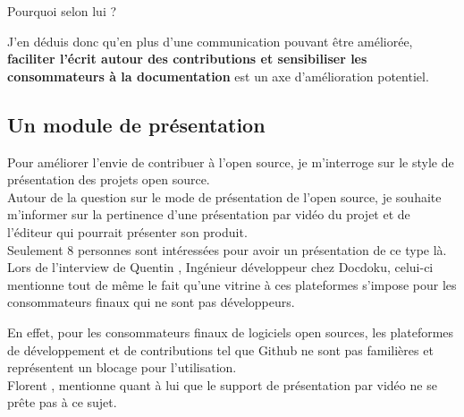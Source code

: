 			Pourquoi selon lui ?

			\begin{center}
				\textit{
				}
			\end{center}

			J'en déduis donc qu'en plus d'une communication pouvant être améliorée, \textbf{faciliter l'écrit autour des contributions et sensibiliser les consommateurs à la documentation} est un axe d'amélioration potentiel.

		\subsection{Un module de présentation}

			Pour améliorer l'envie de contribuer à l'open source, je m'interroge sur le style de présentation des projets open source.\\
			Autour de la question sur le mode de présentation de l'open source, je souhaite m'informer sur la pertinence d'une présentation par vidéo du projet et de l'éditeur qui pourrait présenter son produit.\\
			Seulement 8 personnes sont intéressées pour avoir un présentation de ce type là.\\

			Lors de l'interview de Quentin , Ingénieur développeur chez Docdoku, celui-ci mentionne tout de même le fait qu'une vitrine à ces plateformes s'impose pour les consommateurs finaux qui ne sont pas développeurs.

			\begin{center}
				\textit{
				}
			\end{center}

			En effet, pour les consommateurs finaux de logiciels open sources, les plateformes de développement et de contributions tel que Github ne sont pas familières et représentent un blocage pour l'utilisation.\\

			Florent , mentionne quant à lui que le support de présentation par vidéo ne se prête pas à ce sujet.


